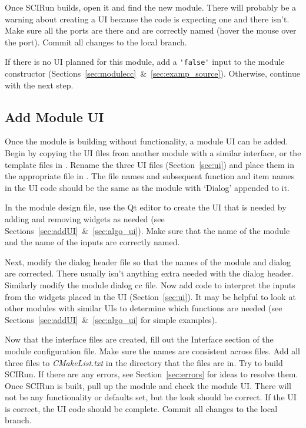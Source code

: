 \documentclass[fleqn,11pt,openany]{book}
\begin{document}
Once SCIRun builds, open it and find the new module.  
There will probably be a warning about creating a UI because the code is expecting one and there isn't.  
Make sure all the ports are there and are correctly named (hover the mouse over the port).  
Commit all changes to the local branch.

If there is no UI planned for this module, add a \verb|'false'| input to the module constructor (Sections~\ref{sec:modulecc}~\&~\ref{sec:examp_source}).  
Otherwise, continue with the next step.

\subsection{Add Module UI}

Once the module is building without functionality, a module UI can be added.  
Begin by copying the UI files from another module with a similar interface, or the template files in \emph{}.
Rename the three UI files (Section~\ref{sec:ui}) and place them in the appropriate file in \emph{}.
The file names and subsequent function and item names in the UI code should be the same as the module with `Dialog' appended to it.

In the module design file, use the Qt editor to create the UI that is needed by adding and removing widgets as needed (see Sections~\ref{sec:addUI}~\&~\ref{sec:algo_ui}).  
Make sure that the name of the module and the name of the inputs are correctly named.  

Next, modify the dialog header file so that the names of the module and dialog are corrected.  
There usually isn't anything extra needed with the dialog header.
Similarly modify the module dialog cc file. 
Now add code to interpret the inputs from the widgets placed in the UI (Section~\ref{sec:ui}). 
It may be helpful to look at other modules with similar UIs to determine which functions are needed  (see Sections~\ref{sec:addUI}~\&~\ref{sec:algo_ui} for simple examples).

Now that the interface files are created, fill out the Interface section of the module configuration file.  
Make sure the names are consistent across files. 
Add all three files to \emph{CMakeList.txt} in the directory that the files are in.  
Try to build SCIRun. If there are any errors, see Section~\ref{sec:errors} for ideas to resolve them.  
Once SCIRun is built, pull up the module and check the module UI.  
There will not be any functionality or defaults set, but the look should be correct.  
If the UI is correct, the UI code should be complete.
Commit all changes to the local branch.
\end{document}
